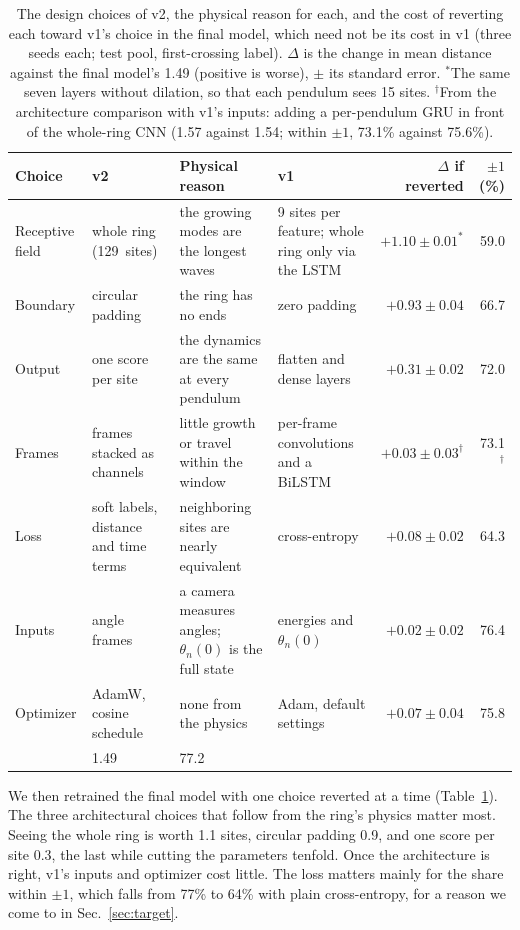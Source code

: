 \documentclass[11pt]{article}
\begin{document}
\begin{table}[t]
  \centering
  \caption{The design choices of v2, the physical reason for each, and the cost of reverting each toward v1's choice in the final model, which need not be its cost in v1 (three seeds each; test pool, first-crossing label). $\Delta$ is the change in mean distance against the final model's 1.49 (positive is worse), $\pm$ its standard error. $^*$The same seven layers without dilation, so that each pendulum sees 15 sites. $^\dagger$From the architecture comparison with v1's inputs: adding a per-pendulum GRU in front of the whole-ring CNN (1.57 against 1.54; within $\pm1$, 73.1\% against 75.6\%).}
  \label{tab:choices}
  \footnotesize
  \setlength{\tabcolsep}{3.5pt}
  \renewcommand{\arraystretch}{1.15}
  \begin{tabular}{@{}>{\raggedright}p{2.1cm}>{\raggedright}p{2.75cm}>{\raggedright}p{4.1cm}>{\raggedright}p{2.75cm}rr@{}}
    \toprule
    Choice & v2 & Physical reason & v1 & $\Delta$ if reverted & $\pm1$ (\%) \tabularnewline
    \midrule
    Receptive field & whole ring (129~sites) & the growing modes are the longest waves & 9 sites per feature; whole ring only via the LSTM & $+1.10\pm0.01^*$ & 59.0 \tabularnewline
    Boundary & circular padding & the ring has no ends & zero padding & $+0.93\pm0.04$ & 66.7 \tabularnewline
    Output & one score per site & the dynamics are the same at every pendulum & flatten and dense layers & $+0.31\pm0.02$ & 72.0 \tabularnewline
    Frames & frames stacked as channels & little growth or travel within the window & per-frame convolutions and a BiLSTM & $+0.03\pm0.03^\dagger$ & 73.1$^\dagger$ \tabularnewline
    Loss & soft labels, distance and time terms & neighboring sites are nearly equivalent & cross-entropy & $+0.08\pm0.02$ & 64.3 \tabularnewline
    Inputs & angle frames & a camera measures angles; $\theta_n(0)$ is the full state & energies and $\theta_n(0)$ & $+0.02\pm0.02$ & 76.4 \tabularnewline
    Optimizer & AdamW, cosine schedule & none from the physics & Adam, default settings & $+0.07\pm0.04$ & 75.8 \tabularnewline
    \midrule
    \multicolumn{4}{@{}l}{Final model} & 1.49 & 77.2 \tabularnewline
    \bottomrule
  \end{tabular}
\end{table}

We then retrained the final model with one choice reverted at a time (Table~\ref{tab:choices}). The three architectural choices that follow from the ring's physics matter most. Seeing the whole ring is worth 1.1 sites, circular padding 0.9, and one score per site 0.3, the last while cutting the parameters tenfold. Once the architecture is right, v1's inputs and optimizer cost little. The loss matters mainly for the share within $\pm1$, which falls from 77\% to 64\% with plain cross-entropy, for a reason we come to in Sec.~\ref{sec:target}.
\end{document}
